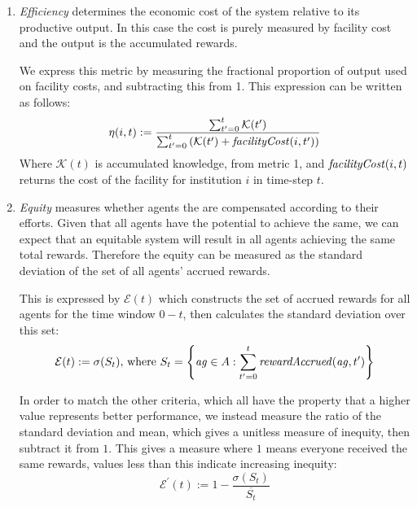 \begin{enumerate}
\item \emph{Efficiency} determines the economic cost of the system relative to its productive output. In this case the cost is purely measured by facility cost and the output is the accumulated rewards.

We express this metric by measuring the fractional proportion of output used on facility costs, and subtracting this from 1. This expression can be written as follows:
\begin{equation*}
\eta(i,t) := \frac{\sum_{t^\prime=0}^{t} \mathcal{K}(t^\prime)}{\sum_{t^\prime=0}^{t} \left( \mathcal{K}(t^\prime) + \mathit{facilityCost}(i,t^\prime) \right)} 
\end{equation*}
Where $\mathcal{K}(t)$ is accumulated knowledge, from metric 1, and $\mathit{facilityCost}(i,t)$ returns the cost of the facility for institution $i$ in time-step $t$.

\item \emph{Equity} measures whether agents the are compensated according to
their efforts.  Given that all agents have the potential to achieve the same,
we can expect that an equitable system will result in all agents achieving the
same total rewards. Therefore the equity can be measured as the standard
deviation of the set of all agents' accrued rewards. 

This is expressed by $\mathcal{E}(t)$ which constructs the set of accrued rewards for all agents for the time window $0-t$, then calculates the standard deviation over this set:
\begin{equation*}
\mathcal{E}(t) := \sigma ( S_t ) \text{, where } S_t = \left\{ \mathit{ag}\in A : \sum_{t^\prime=0}^{t} \mathit{rewardAccrued}(\mathit{ag}, t^\prime) \right\}
\end{equation*}

In order to match the other
criteria, which all have the property that a higher value represents better
performance, we instead measure the ratio of the standard deviation and mean,
which gives a unitless measure of inequity, then subtract it from $1$. This
gives a measure where $1$ means everyone received the same rewards, values less than
this indicate increasing inequity:
\begin{equation*}
\mathcal{E}^\prime(t) := 1 - \frac{\sigma ( S_t )}{\overline{S_t}}
\end{equation*}

\end{enumerate}


